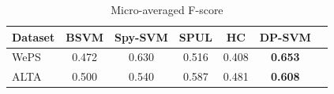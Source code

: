 \documentclass[letterpaper]{sig-alternate-2013}
\begin{document}


\begin{table}[t]
  \centering
\begin{small}
 \begin{tabular}{lcccccc}
     \toprule
Dataset &  BSVM &Spy-SVM& SPUL  & HC & DP-SVM  \\ 
 \midrule
  WePS &   0.472 &  0.630 & 0.516  &  0.408 & \textbf{0.653}\\ 
    ALTA &  0.500 &0.540 & 0.587  &  0.481 & \textbf{0.608}\\ 
 \bottomrule
  \end{tabular}
\end{small}
\vspace{-3ex}
\caption{Micro-averaged F-score}
\label{tab:results}
\end{table}

\end{document}
